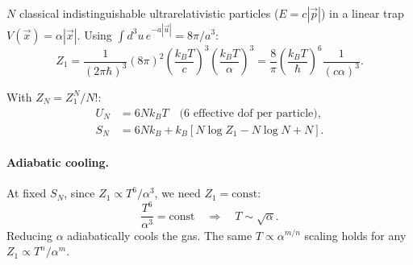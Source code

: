 \begin{example}
$N$ classical indistinguishable ultrarelativistic particles ($E = c|\vec{p}|$) in a linear trap $V(\vec{x}) = \alpha|\vec{x}|$. Using $\int d^3u\, e^{-a|\vec{u}|} = 8\pi/a^3$:
\begin{equation}
    Z_1 = \frac{1}{(2\pi\hbar)^3}(8\pi)^2
    \left(\frac{k_BT}{c}\right)^3\!\left(\frac{k_BT}{\alpha}\right)^3
    = \frac{8}{\pi}\!\left(\frac{k_BT}{\hbar}\right)^6 \frac{1}{(c\alpha)^3}.
\end{equation}

With $Z_N = Z_1^N/N!$:
\begin{align}
    U_N &= 6Nk_BT \quad\text{(6 effective dof per particle)},\\
    S_N &= 6Nk_B + k_B\!\left[N\log Z_1 - N\log N + N\right].
\end{align}

\paragraph{Adiabatic cooling.} At fixed $S_N$, since $Z_1 \propto T^6/\alpha^3$, we need $Z_1 = \text{const}$:
\begin{equation}
    \frac{T^6}{\alpha^3} = \text{const}
    \quad\Longrightarrow\quad \boxed{T \sim \sqrt{\alpha}}.
\end{equation}
Reducing $\alpha$ adiabatically cools the gas. The same $T \propto \alpha^{m/n}$ scaling holds for any $Z_1 \propto T^n/\alpha^m$.
\end{example}
